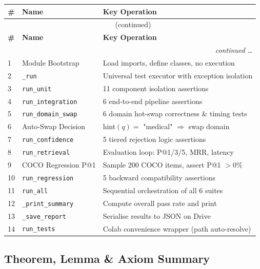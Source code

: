 \documentclass[12pt,a4paper]{article}
\begin{document}
\begin{longtable}{p{0.6cm} p{5.5cm} p{8cm}}
\toprule
\textbf{\#} & \textbf{Name} & \textbf{Key Operation}\\
\midrule
\endfirsthead
\multicolumn{3}{c}{\tablename\ \thetable{} (continued)}\\
\toprule
\textbf{\#} & \textbf{Name} & \textbf{Key Operation}\\
\midrule
\endhead
\midrule
\multicolumn{3}{r}{\textit{continued \ldots}}\\
\endfoot
\bottomrule
\endlastfoot

1  & Module Bootstrap              & Load imports, define classes, no execution \\
2  & \texttt{\_run}                & Universal test executor with exception isolation \\
3  & \texttt{run\_unit}            & 11 component isolation assertions \\
4  & \texttt{run\_integration}     & 6 end-to-end pipeline assertions \\
5  & \texttt{run\_domain\_swap}    & 6 domain hot-swap correctness \& timing tests \\
6  & Auto-Swap Decision            & hint$(q) =$ "medical" $\Rightarrow$ swap domain \\
7  & \texttt{run\_confidence}      & 5 tiered rejection logic assertions \\
8  & \texttt{run\_retrieval}       & Evaluation loop: P@1/3/5, MRR, latency \\
9  & COCO Regression P@1           & Sample 200 COCO items, assert P@1 $> 0\%$ \\
10 & \texttt{run\_regression}      & 5 backward compatibility assertions \\
11 & \texttt{run\_all}             & Sequential orchestration of all 6 suites \\
12 & \texttt{\_print\_summary}     & Compute overall pass rate and print \\
13 & \texttt{\_save\_report}       & Serialise results to JSON on Drive \\
14 & \texttt{run\_tests}           & Colab convenience wrapper (path auto-resolve) \\
\end{longtable}

\subsection{Theorem, Lemma \& Axiom Summary}
\end{document}
